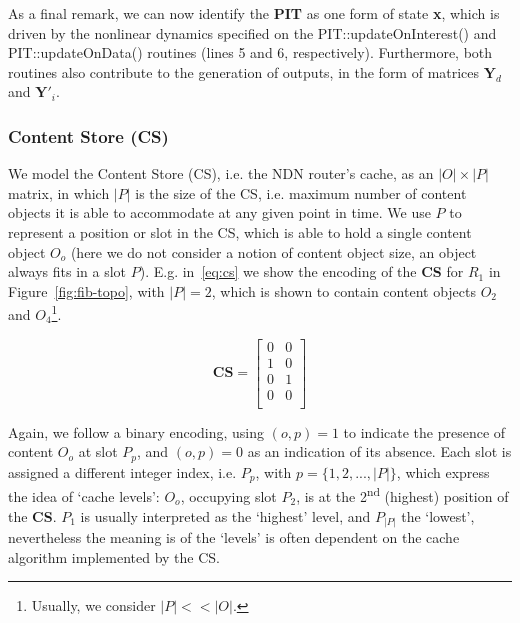 As a final remark, we can now identify the \textbf{PIT} as one form of state 
\textbf{x}, which is driven by the nonlinear dynamics specified on the 
PIT::updateOnInterest() and PIT::updateOnData() routines (lines 5 and 6, respectively). 
Furthermore, both routines also contribute to the generation of outputs, 
in the form of matrices $\textbf{Y}_d$ and $\textbf{Y}'_i$.\shortvertbreak

\subsubsection{Content Store (CS)}
\label{subsec:meth-cs}

We model the Content Store (CS), i.e. the NDN router's cache, as an $|O| 
\times |P|$ matrix, in which $|P|$ is the size of the CS, i.e. maximum 
number of content objects it is able to accommodate at any given point in time. 
We use $P$ to represent a position or slot in the CS, which is able to hold a single 
content object $O_o$ (here we do not consider a notion of content object size, 
an object always fits in a slot $P$). E.g. in~\ref{eq:cs} we show the encoding 
of the \textbf{CS} for $R_1$ in Figure~\ref{fig:fib-topo}, with $|P| = 2$, 
which is shown to contain content objects $O_2$ and $O_4$\footnote{Usually, 
we consider $|P| << |O|$.}.

\begin{equation}
\textbf{CS} = \begin{bmatrix} 0 & 0             \\ 
                1 & 0                           \\ 
                0 & 1                           \\ 
                0 & 0                           \\ \end{bmatrix}
    \label{eq:cs}
\end{equation}\shortvertbreak

Again, we follow a binary encoding, using $(o, p) = 1$ to indicate the 
presence of content $O_o$ at slot $P_p$, and $(o, p) = 0$ as an indication of 
its absence. Each slot is assigned a different integer 
index, i.e. $P_p$, with $p = \{1, 2, ..., |P|\}$, which express the idea of `cache levels': 
$O_o$, occupying slot $P_2$, is at the 2\textsuperscript{nd} 
(highest) position of the \textbf{CS}. $P_1$ is usually interpreted as the `highest' 
level, and $P_{|P|}$ the `lowest', nevertheless the meaning is of the `levels' 
is often dependent on the cache algorithm implemented by the CS.\shortvertbreak

